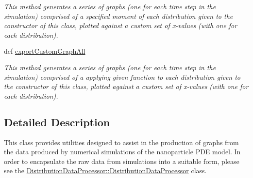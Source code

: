 \begin{DoxyCompactItemize}
\begin{DoxyCompactList}\small\item\em This method generates a series of graphs (one for each time step in the simulation) comprised of a specified moment of each distribution given to the constructor of this class, plotted against a custom set of x-\/values (with one for each distribution). \item\end{DoxyCompactList}\item 
def \hyperlink{class_distribution_data_visualiser_1_1_distribution_data_visualiser_ad6e78a55430f4f39b30ff1867c8f1631}{exportCustomGraphAll}
\begin{DoxyCompactList}\small\item\em This method generates a series of graphs (one for each time step in the simulation) comprised of a applying given function to each distribution given to the constructor of this class, plotted against a custom set of x-\/values (with one for each distribution). \item\end{DoxyCompactList}\end{DoxyCompactItemize}


\subsection{Detailed Description}
This class provides utilities designed to assist in the production of graphs from the data produced by numerical simulations of the nanoparticle PDE model. In order to encapsulate the raw data from simulations into a suitable form, please see the \hyperlink{class_distribution_data_processor_1_1_distribution_data_processor}{DistributionDataProcessor::DistributionDataProcessor} class. 

